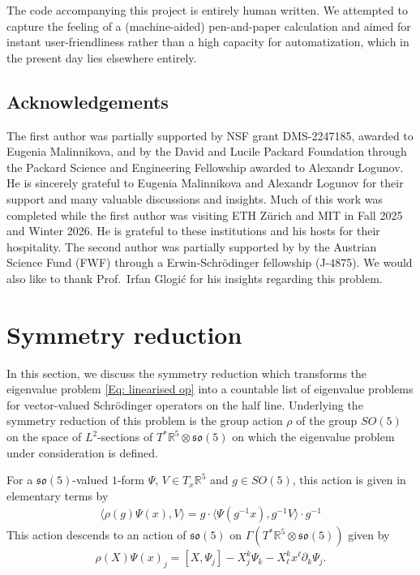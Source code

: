 \documentclass[11pt,reqno]{amsart}
\theoremstyle{remark}
\theoremstyle{definition}
\newcommand{\sov}{\mathfrak{so}(5)}
\begin{document}
The code accompanying this project is entirely human written. We attempted to capture the feeling of a (machine-aided) pen-and-paper calculation and aimed for instant user-friendliness rather than a high capacity for automatization, which in the present day lies elsewhere entirely. 

\subsection{Acknowledgements}

The first author was partially supported by NSF grant DMS-2247185, awarded to Eugenia Malinnikova, and by the David and Lucile Packard Foundation through the Packard Science and Engineering Fellowship awarded to Alexandr Logunov. He is sincerely grateful to Eugenia Malinnikova and Alexandr Logunov for their support and many valuable discussions and insights. Much of this work was completed while the first author was visiting ETH Zürich and MIT in Fall 2025 and Winter 2026. He is grateful to these institutions and his hosts for their hospitality. The second author was partially supported by by the Austrian Science Fund (FWF) through a Erwin-Schrödinger fellowship (J-4875). We would also like to thank Prof.~Irfan Glogić for his insights regarding this problem.

\section{Symmetry reduction}
\label{sec:symmetry_reduction}

In this section, we discuss the symmetry reduction which transforms the eigenvalue problem \eqref{Eq: linearised op} into a countable list of eigenvalue problems for vector-valued Schr\"odinger operators on the half line. Underlying the symmetry reduction of this problem is the group action $\rho$ of the group $SO(5)$ on the space of $L^2$-sections of $T^\ast \mathbb R^5 \otimes \sov$ on which the eigenvalue problem under consideration is defined.

For a $\sov$-valued $1$-form $\Psi$, $V \in T_x \mathbb R^5$ and $g \in SO(5)$, this action is given in elementary terms by
\begin{align*}
    \langle \rho(g) \Psi (x),  V \rangle = g \cdot \langle \Psi(g^{-1} x), g^{-1} V \rangle \cdot g^{-1}
\end{align*}
This action descends to an action of $\sov$ on $\Gamma(T^\ast \mathbb R^5 \otimes \sov)$ given by 
\begin{align*}
    \rho(X) \Psi (x)_j = [X,\Psi_j] - X^k_j \Psi_k - X^k_\ell x^\ell \partial_k \Psi_j.
\end{align*}
\end{document}
